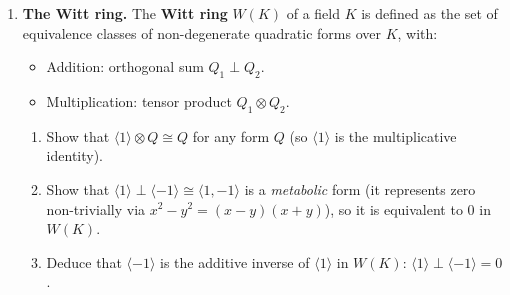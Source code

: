 \begin{enumerate}
    \item[$\star$] \textbf{The Witt ring.} The \textbf{Witt ring} $W(K)$ of a field $K$ is defined as the set of equivalence classes of non-degenerate quadratic forms over $K$, with:
    \begin{itemize}
        \item Addition: orthogonal sum $Q_1 \perp Q_2$.
        \item Multiplication: tensor product $Q_1 \otimes Q_2$.
    \end{itemize}
    \begin{enumerate}
        \item Show that $\langle 1 \rangle \otimes Q \cong Q$ for any form $Q$ (so $\langle 1 \rangle$ is the multiplicative identity).
        \item Show that $\langle 1 \rangle \perp \langle -1 \rangle \cong \langle 1, -1 \rangle$ is a \emph{metabolic} form (it represents zero non-trivially via $x^2 - y^2 = (x-y)(x+y)$), so it is equivalent to $0$ in $W(K)$.
        \item Deduce that $\langle -1 \rangle$ is the additive inverse of $\langle 1 \rangle$ in $W(K)$: $\langle 1 \rangle \perp \langle -1 \rangle = 0$.
    \end{enumerate}

\end{enumerate}

